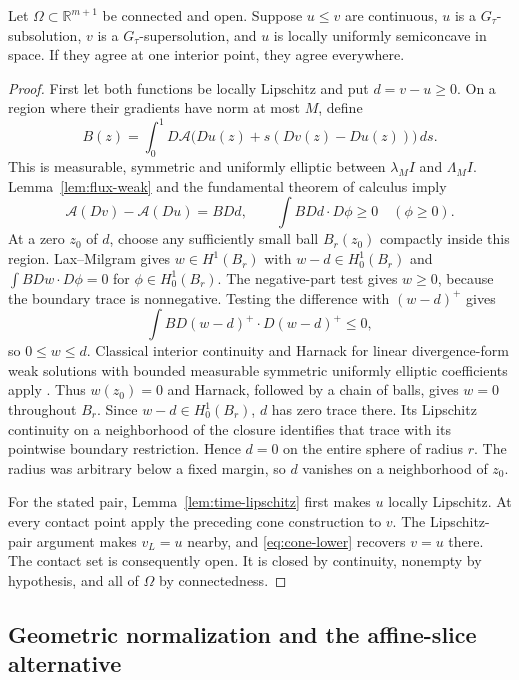 \begin{theorem}\label{thm:contact}
Let $\Omega\subset\mathbb R^{m+1}$ be connected and open. Suppose
$u\leq v$ are continuous, $u$ is a $G_\tau$-subsolution, $v$ is a
$G_\tau$-supersolution, and $u$ is locally uniformly semiconcave in
space. If they agree at one interior point, they agree everywhere.
\end{theorem}
\begin{proof}
First let both functions be locally Lipschitz and put $d=v-u\geq0$.
On a region where their gradients have norm at most $M$, define
\[
 B(z)=\int_0^1D\mathcal A\bigl(Du(z)+s(Dv(z)-Du(z))\bigr)\,ds.
\]
This is measurable, symmetric and uniformly elliptic between
$\lambda_MI$ and $\Lambda_MI$. Lemma~\ref{lem:flux-weak} and the
fundamental theorem of calculus imply
\[
 \mathcal A(Dv)-\mathcal A(Du)=B Dd,\qquad
 \int B Dd\cdot D\phi\geq0\quad(\phi\geq0).
\]
At a zero $z_0$ of $d$, choose any sufficiently small ball $B_r(z_0)$
compactly inside this region. Lax--Milgram gives $w\in H^1(B_r)$ with
$w-d\in H^1_0(B_r)$ and
$\int BDw\cdot D\phi=0$ for $\phi\in H^1_0(B_r)$.
The negative-part test gives $w\geq0$, because the boundary trace is
nonnegative. Testing the difference with $(w-d)^+$ gives
\[
 \int BD(w-d)^+\cdot D(w-d)^+\leq0,
\]
so $0\leq w\leq d$. Classical interior continuity and Harnack for
linear divergence-form weak solutions with bounded measurable
symmetric uniformly elliptic coefficients apply
\cite[Sections 2--3]{Crescimbeni}. Thus $w(z_0)=0$ and Harnack,
followed by a chain of balls, gives $w=0$ throughout $B_r$.
Since $w-d\in H^1_0(B_r)$, $d$ has zero trace there. Its Lipschitz
continuity on a neighborhood of the closure identifies that trace
with its pointwise boundary restriction. Hence $d=0$ on the entire
sphere of radius $r$. The radius was arbitrary below a fixed margin,
so $d$ vanishes on a neighborhood of $z_0$.

For the stated pair, Lemma~\ref{lem:time-lipschitz} first makes $u$
locally Lipschitz. At every contact point apply the preceding cone
construction to $v$. The Lipschitz-pair argument makes $v_L=u$
nearby, and \eqref{eq:cone-lower} recovers $v=u$ there. The contact
set is consequently open. It is closed by continuity, nonempty by
hypothesis, and all of $\Omega$ by connectedness.
\end{proof}

\subsection{Geometric normalization and the affine-slice alternative}

